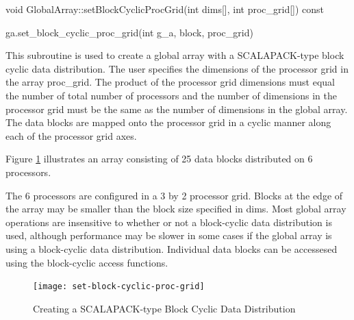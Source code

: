 \documentclass[12pt]{article}
\begin{document}
\begin{cxxapi}
\begin{cxxcode}
void GlobalArray::setBlockCyclicProcGrid(int dims[], int proc_grid[]) const
\end{cxxcode}
\begin{funcargs}
\end{funcargs}
\end{cxxapi}

\begin{pyapi}
\begin{pycode}
ga.set_block_cyclic_proc_grid(int g_a, block, proc_grid)
\end{pycode}
\begin{funcargs}
\end{funcargs}
\end{pyapi}

\gcoll

\begin{desc}

This subroutine is used to create a global array with a SCALAPACK-type block
cyclic data distribution. The user specifies the dimensions of the processor
grid in the array proc_grid. The product of the processor grid dimensions must
equal the number of total number of processors and the number of dimensions in
the processor grid must be the same as the number of dimensions in the global
array. The data blocks are mapped onto the processor grid in a cyclic manner
along each of the processor grid axes.

Figure \ref{setblkcyprocgrid} illustrates an array consisting of 25 data blocks
distributed on 6 processors.

The 6 processors are configured in a 3 by 2 processor grid. Blocks at the edge
of the array may be smaller than the block size specified in dims.  Most global
array operations  are insensitive to whether or not a block-cyclic data
distribution is used, although performance may be slower in some cases if the
global array is using a block-cyclic data distribution. Individual data blocks
can be accessesed using the block-cyclic access functions.

\begin{figure}
\centering
\texttt{[image: set-block-cyclic-proc-grid]}
\caption{Creating a SCALAPACK-type Block Cyclic Data Distribution}
\label{setblkcyprocgrid}
\end{figure}

\end{desc}
\end{document}
